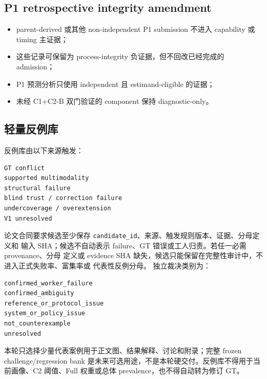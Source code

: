 \subsection{P1 retrospective integrity amendment}

\begin{itemize}
  \item parent-derived 或其他 non-independent P1 submission 不进入 capability 或 timing 主证据；
  \item 这些记录可保留为 process-integrity 负证据，但不回改已经完成的 admission；
  \item P1 预测分析只使用 independent 且 estimand-eligible 的证据；
  \item 未经 C1+C2-B 双门验证的 component 保持 diagnostic-only。
\end{itemize}

\subsection{轻量反例库}

反例库由以下来源触发：

\begin{verbatim}
GT conflict
supported multimodality
structural failure
blind trust / correction failure
undercoverage / overextension
V1 unresolved
\end{verbatim}

论文合同要求候选至少保存 \texttt{candidate\_id}、来源、触发规则版本、证据、分母定义和
输入 SHA；候选不自动表示 failure、GT 错误或工人归责。若任一必需 provenance、分母
定义或 evidence SHA 缺失，候选只能保留在完整性审计中，不进入正式失败率、富集率或
代表性反例分母。
独立裁决类别为：

\begin{verbatim}
confirmed_worker_failure
confirmed_ambiguity
reference_or_protocol_issue
system_or_policy_issue
not_counterexample
unresolved
\end{verbatim}

本轮只选择少量代表案例用于正文图、结果解释、讨论和附录；完整 frozen challenge/regression
bank 是未来可选用途，不是本轮硬交付。反例库不得用于当前画像、C2 阈值、Full 权重或总体
prevalence，也不得自动转为修订 GT。
